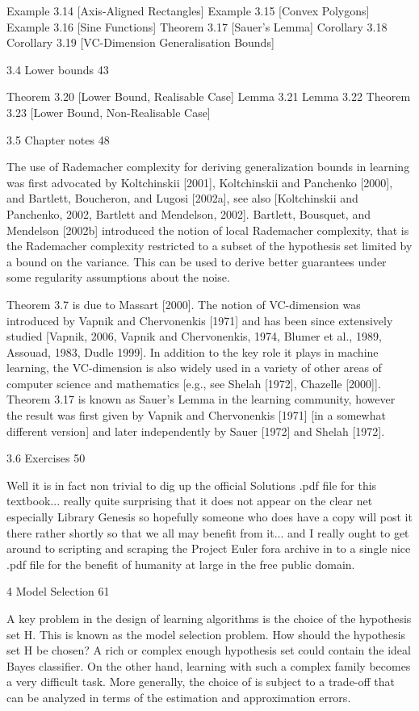 Example 3.14 [Axis-Aligned Rectangles]
Example 3.15 [Convex Polygons]
Example 3.16 [Sine Functions]
Theorem 3.17 [Sauer's Lemma]
Corollary 3.18
Corollary 3.19 [VC-Dimension Generalisation Bounds]

3.4 Lower bounds 43

Theorem 3.20 [Lower Bound, Realisable Case]
Lemma 3.21
Lemma 3.22
Theorem 3.23 [Lower Bound, Non-Realisable Case]

3.5 Chapter notes 48

The use of Rademacher complexity for deriving generalization bounds in learning was first advocated by Koltchinskii [2001], Koltchinskii and Panchenko [2000], and Bartlett, Boucheron, and Lugosi [2002a], see also [Koltchinskii and Panchenko, 2002, Bartlett and Mendelson, 2002]. Bartlett, Bousquet, and Mendelson [2002b] introduced the notion of local Rademacher complexity, that is the Rademacher complexity restricted to a subset of the hypothesis set limited by a bound on the variance. This can be used to derive better guarantees under some regularity assumptions about the noise.

Theorem 3.7 is due to Massart [2000]. The notion of VC-dimension was introduced by Vapnik and Chervonenkis [1971] and has been since extensively studied [Vapnik, 2006, Vapnik and Chervonenkis, 1974, Blumer et al., 1989, Assouad, 1983, Dudle 1999]. In addition to the key role it plays in machine learning, the VC-dimension is also widely used in a variety of other areas of computer science and mathematics [e.g., see Shelah [1972], Chazelle [2000]]. Theorem 3.17 is known as Sauer's Lemma in the learning community, however the result was first given by Vapnik and Chervonenkis [1971] [in a somewhat different version] and later independently by Sauer [1972] and Shelah [1972].

3.6 Exercises 50

Well it is in fact non trivial to dig up the official Solutions .pdf file for this textbook... really quite surprising that it does not appear on the clear net especially Library Genesis so hopefully someone who does have a copy will post it there rather shortly so that we all may benefit from it... and I really ought to get around to scripting and scraping the Project Euler fora archive in to a single nice .pdf file for the benefit of humanity at large in the free public domain.

4 Model Selection 61

A key problem in the design of learning algorithms is the choice of the hypothesis set H. This is known as the model selection problem. How should the hypothesis set H be chosen? A rich or complex enough hypothesis set could contain the ideal Bayes classifier. On the other hand, learning with such a complex family becomes a very difficult task. More generally, the choice of is subject to a trade-off that can be analyzed in terms of the estimation and approximation errors.

